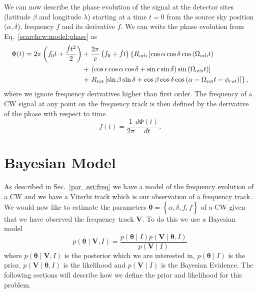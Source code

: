 We can now describe the phase evolution of the signal at the detector
sites (latitude $\beta$ and longitude $\lambda$) starting at a time $t=0$ from the source sky
position ($\alpha, \delta$), frequency $f$ and its derivative
$\dot{f}$.  We can write the phase evolution from Eq.~\ref{searchcw:model:phase} as
%
\begin{equation}
    \label{par_est:freq:ph_evolution}
    \begin{split}
        \Phi(t) = 2\pi \left(  f_0 t + \frac{\dot{f} t^2}{2} \right) &+ \frac{2\pi}{c} \left(  f_0 + \dot{f}t  \right) \left\{ R_{\rm{orb}} \left[ \cos \alpha \cos \delta \cos \left( \Omega_{\mathrm{orb}} t \right) \right. \right. \\ 
        &+ \left. \left( \cos \epsilon \cos \alpha \cos \delta +  \sin \epsilon \sin \delta \right) \sin \left( \Omega_{\mathrm{orb}} t  \right) \right] \\
        &+ \left. R_{\rm{rot}} \left[ \sin \beta \sin \delta + \cos \beta \cos \delta \cos \left( \alpha - \Omega_{\mathrm{rot}} t - \phi_{rot}  \right)     \right] \right\},
    \end{split}
\end{equation}
%
where we ignore frequency derivatives higher than first order.
The frequency of a \gls{CW} signal at any point on the frequency track is then defined by the derivative of
the phase with respect to time
%
\begin{equation}
f(t) = \frac{1}{2\pi}\frac{d\Phi(t)}{dt}.
\end{equation}

%
%
\section{\label{par_est:bayes}Bayesian Model}
%
%

As described in Sec.~\ref{par_est:freq} we have a model of the frequency
evolution of a \gls{CW} and we have a Viterbi track which is our observation of
a frequency track.  We would now like to estimate the parameters $\bm{\theta} =
\left\{\alpha, \delta, f, \dot{f} \right\}$ of a \gls{CW} given that we have
observed the frequency track $\bm{V}$.  To do this we use a Bayesian model
%
\begin{equation}
    \label{par_est:bayes:eqn}
    p(\bm{\theta} \mid \bm{V}, I) = \frac{p(\bm{\theta} \mid I) p(\bm{V} \mid \bm{\theta}, I)}{p(\bm{V} \mid I)}
\end{equation}
%
where $p(\bm{\theta} \mid \bm{V}, I)$ is the posterior which we are interested in,
$p(\bm{\theta} \mid I)$ is the prior, $p(\bm{V} \mid \bm{\theta}, I)$ is the
likelihood and $p(\bm{V} \mid I)$ is the Bayesian Evidence. The
following sections will describe how we define the prior and likelihood for
this problem.


